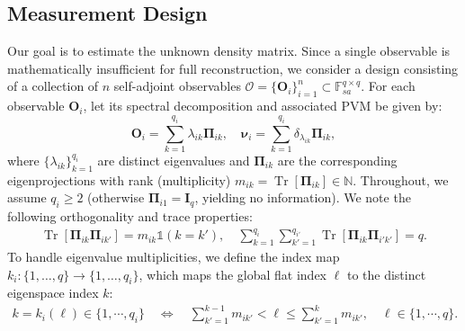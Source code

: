 \documentclass[noinfoline]{imsart}\setcounter{tocdepth}{2}
\renewcommand{\b}[1]{\mathbb{#1}} %
\newcommand{\m}[1]{\mathbf{#1}} %
\newcommand{\s}[1]{\mathscr{#1}} %
\newcommand{\ds}[1]{\mathds{#1}} %
\newcommand{\mb}[1]{\boldsymbol{#1}} %
\newcommand{\tr}[1]{\operatorname{Tr}\left[#1\right]}
\theoremstyle{plain}
\begin{document}
\subsection{Measurement Design}\label{ssec:identi:dsgn}
Our goal is to estimate the unknown density matrix. Since a single observable is mathematically insufficient for full reconstruction, we consider a design consisting of a collection of $n$ self-adjoint observables $\s{O} = \{ \m{O}_{i} \}_{i=1}^n \subset \b{F}_{sa}^{q \times q}$.
For each observable $\m{O}_{i}$, let its spectral decomposition and associated PVM be given by:
\begin{equation*}%
    \m{O}_{i} = \sum_{k=1}^{q_{i}} \lambda_{ik} \m{\Pi}_{ik}, \quad \mb{\nu}_{i} =  \sum_{k=1}^{q_{i}} \delta_{\lambda_{ik}} \m{\Pi}_{ik},
\end{equation*}
where $\{\lambda_{ik}\}_{k=1}^{q_i}$ are distinct eigenvalues and $\m{\Pi}_{ik}$ are the corresponding eigenprojections with rank (multiplicity) $m_{ik} = \tr{\m{\Pi}_{ik}} \in \b{N}$. Throughout, we assume $q_{i} \ge 2$ (otherwise $\m{\Pi}_{i1} = \m{I}_{q}$, yielding no information). We note the following orthogonality and trace properties:
\begin{align*}
    \tr{\m{\Pi}_{ik} \m{\Pi}_{ik'}} = m_{ik} \ds{1} (k=k'), \quad \sum_{k=1}^{q_{i}} \sum_{k'=1}^{q_{i'}} \tr{\m{\Pi}_{ik} \m{\Pi}_{i'k'}} = q.
\end{align*}
To handle eigenvalue multiplicities, we define the index map $k_i : \{1, \dots, q\} \to \{1, \dots, q_i\}$, which maps the global flat index $\ell$ to the distinct eigenspace index $k$:
\begin{align*}
    k = k_{i}(\ell) \in \{1, \cdots, q_{i} \} \quad \Longleftrightarrow \quad \sum_{k' =1}^{k-1} m_{ik'} < \ell \le \sum_{k' =1}^{k} m_{ik'}, \quad \ell \in \{1, \cdots, q \}.
\end{align*}
\end{document}
